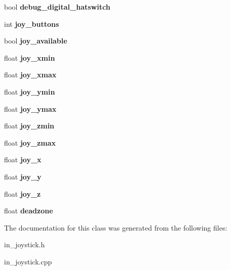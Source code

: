 \begin{DoxyCompactItemize}
\item 
bool {\bfseries debug\+\_\+digital\+\_\+hatswitch}\hypertarget{classJoyStick_af8d55c0d23e0ede05e44c5e986e12545}{}\label{classJoyStick_af8d55c0d23e0ede05e44c5e986e12545}

\item 
int {\bfseries joy\+\_\+buttons}\hypertarget{classJoyStick_a589b8f637ef43b37276b488f1a7ba5a8}{}\label{classJoyStick_a589b8f637ef43b37276b488f1a7ba5a8}

\item 
bool {\bfseries joy\+\_\+available}\hypertarget{classJoyStick_a779be88855642d95c7c893611cadbe52}{}\label{classJoyStick_a779be88855642d95c7c893611cadbe52}

\item 
float {\bfseries joy\+\_\+xmin}\hypertarget{classJoyStick_ab420e9541fa07a893b9f55d487192530}{}\label{classJoyStick_ab420e9541fa07a893b9f55d487192530}

\item 
float {\bfseries joy\+\_\+xmax}\hypertarget{classJoyStick_a0487512792f49c5cade9e0a026e90f44}{}\label{classJoyStick_a0487512792f49c5cade9e0a026e90f44}

\item 
float {\bfseries joy\+\_\+ymin}\hypertarget{classJoyStick_af208d4216cab262c9dff5fd2318dd68b}{}\label{classJoyStick_af208d4216cab262c9dff5fd2318dd68b}

\item 
float {\bfseries joy\+\_\+ymax}\hypertarget{classJoyStick_ac2c0fc48e9c1902da05e96e2aea3db67}{}\label{classJoyStick_ac2c0fc48e9c1902da05e96e2aea3db67}

\item 
float {\bfseries joy\+\_\+zmin}\hypertarget{classJoyStick_aa80421fc3d8304652e3ef0b18eba5904}{}\label{classJoyStick_aa80421fc3d8304652e3ef0b18eba5904}

\item 
float {\bfseries joy\+\_\+zmax}\hypertarget{classJoyStick_aefdb1a27acdc031309c1a556fa3cbe6c}{}\label{classJoyStick_aefdb1a27acdc031309c1a556fa3cbe6c}

\item 
float {\bfseries joy\+\_\+x}\hypertarget{classJoyStick_a34332cb4928cadbe8ee7fbaafe4a8cc2}{}\label{classJoyStick_a34332cb4928cadbe8ee7fbaafe4a8cc2}

\item 
float {\bfseries joy\+\_\+y}\hypertarget{classJoyStick_ad9ccf6e6ffa08ad219fd8fa0f698e943}{}\label{classJoyStick_ad9ccf6e6ffa08ad219fd8fa0f698e943}

\item 
float {\bfseries joy\+\_\+z}\hypertarget{classJoyStick_ae1876e06ca36e478f13c7a503ac9c9c5}{}\label{classJoyStick_ae1876e06ca36e478f13c7a503ac9c9c5}

\item 
float {\bfseries deadzone}\hypertarget{classJoyStick_a6a1e9bd5c748fd9216ea268f91561c94}{}\label{classJoyStick_a6a1e9bd5c748fd9216ea268f91561c94}

\end{DoxyCompactItemize}


The documentation for this class was generated from the following files\+:\begin{DoxyCompactItemize}
\item 
in\+\_\+joystick.\+h\item 
in\+\_\+joystick.\+cpp\end{DoxyCompactItemize}
